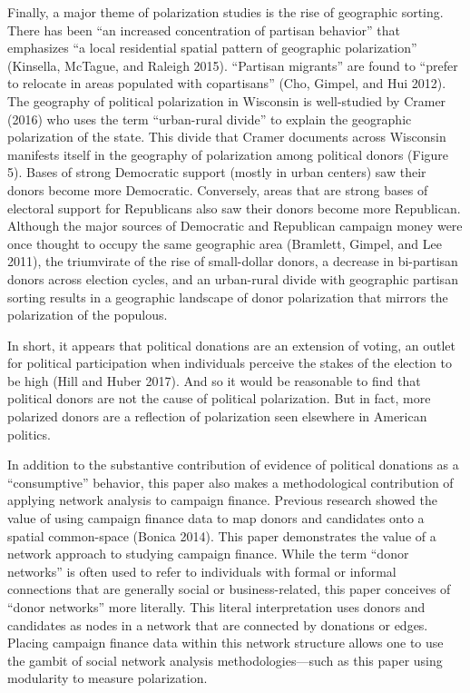 \documentclass[12pt,]{article}
\begin{document}
Finally, a major theme of polarization studies is the rise of geographic
sorting. There has been ``an increased concentration of partisan
behavior'' that emphasizes ``a local residential spatial pattern of
geographic polarization'' (Kinsella, McTague, and Raleigh 2015).
``Partisan migrants'' are found to ``prefer to relocate in areas
populated with copartisans'' (Cho, Gimpel, and Hui 2012). The geography
of political polarization in Wisconsin is well-studied by Cramer (2016)
who uses the term ``urban-rural divide'' to explain the geographic
polarization of the state. This divide that Cramer documents across
Wisconsin manifests itself in the geography of polarization among
political donors (Figure 5). Bases of strong Democratic support (mostly
in urban centers) saw their donors become more Democratic. Conversely,
areas that are strong bases of electoral support for Republicans also
saw their donors become more Republican. Although the major sources of
Democratic and Republican campaign money were once thought to occupy the
same geographic area (Bramlett, Gimpel, and Lee 2011), the triumvirate
of the rise of small-dollar donors, a decrease in bi-partisan donors
across election cycles, and an urban-rural divide with geographic
partisan sorting results in a geographic landscape of donor polarization
that mirrors the polarization of the populous.

In short, it appears that political donations are an extension of
voting, an outlet for political participation when individuals perceive
the stakes of the election to be high (Hill and Huber 2017). And so it
would be reasonable to find that political donors are not the cause of
political polarization. But in fact, more polarized donors are a
reflection of polarization seen elsewhere in American politics.

In addition to the substantive contribution of evidence of political
donations as a ``consumptive'' behavior, this paper also makes a
methodological contribution of applying network analysis to campaign
finance. Previous research showed the value of using campaign finance
data to map donors and candidates onto a spatial common-space (Bonica
2014). This paper demonstrates the value of a network approach to
studying campaign finance. While the term ``donor networks'' is often
used to refer to individuals with formal or informal connections that
are generally social or business-related, this paper conceives of
``donor networks'' more literally. This literal interpretation uses
donors and candidates as nodes in a network that are connected by
donations or edges. Placing campaign finance data within this network
structure allows one to use the gambit of social network analysis
methodologies---such as this paper using modularity to measure
polarization.
\end{document}
